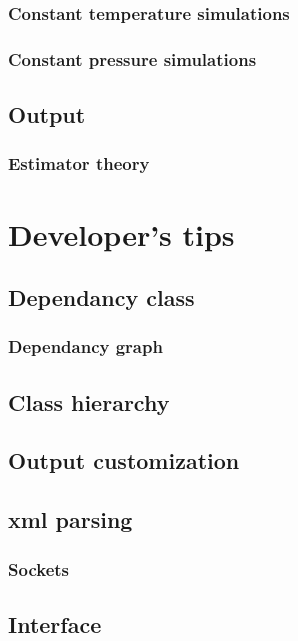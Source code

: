 \documentclass[12pt,fleqn]{report}
\begin{document}
\subsection{Constant temperature simulations}
\subsection{Constant pressure simulations}
\section{Output}
\subsection{Estimator theory}

\chapter{Developer's tips}
\section{Dependancy class}
\subsection{Dependancy graph}
\section{Class hierarchy}
\section{Output customization}
\section{xml parsing}
\subsection{Sockets}
\section{Interface}

\begin{thebibliography}{99}
\end{thebibliography}
\end{document}
